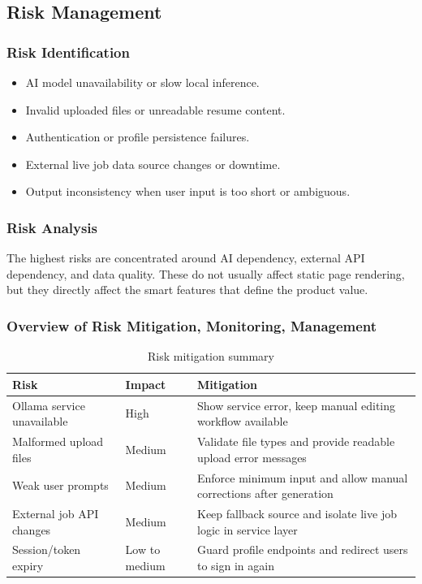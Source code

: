 \subsection{Risk Management}
\subsubsection{Risk Identification}
\begin{itemize}
\item AI model unavailability or slow local inference.
\item Invalid uploaded files or unreadable resume content.
\item Authentication or profile persistence failures.
\item External live job data source changes or downtime.
\item Output inconsistency when user input is too short or ambiguous.
\end{itemize}

\subsubsection{Risk Analysis}
\noindent The highest risks are concentrated around AI dependency, external API dependency, and data quality. These do not usually affect static page rendering, but they directly affect the smart features that define the product value.

\subsubsection{Overview of Risk Mitigation, Monitoring, Management}
\begin{table}[H]
\centering
\caption{Risk mitigation summary}
\begin{tabular}{|p{4.0cm}|p{3.4cm}|p{5.0cm}|}
\hline
\textbf{Risk} & \textbf{Impact} & \textbf{Mitigation} \\
\hline
Ollama service unavailable & High & Show service error, keep manual editing workflow available \\
\hline
Malformed upload files & Medium & Validate file types and provide readable upload error messages \\
\hline
Weak user prompts & Medium & Enforce minimum input and allow manual corrections after generation \\
\hline
External job API changes & Medium & Keep fallback source and isolate live job logic in service layer \\
\hline
Session/token expiry & Low to medium & Guard profile endpoints and redirect users to sign in again \\
\hline
\end{tabular}
\end{table}
